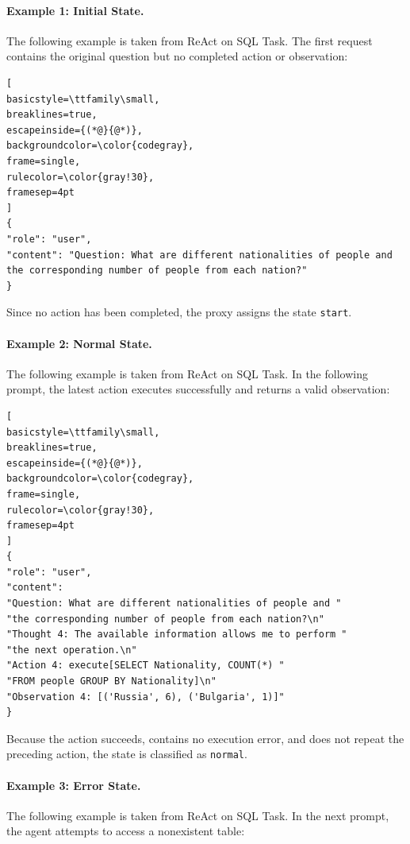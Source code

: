 \paragraph{Example 1: Initial State.}
The following example is taken from ReAct on SQL Task.
The first request contains the original question but no completed
action or observation:

\begin{lstlisting}[
basicstyle=\ttfamily\small,
breaklines=true,
escapeinside={(*@}{@*)},
backgroundcolor=\color{codegray},
frame=single,
rulecolor=\color{gray!30},
framesep=4pt
]
{
"role": "user",
"content": "Question: What are different nationalities of people and the corresponding number of people from each nation?"
}
\end{lstlisting}

Since no action has been completed, the proxy assigns the state
\texttt{start}.

\paragraph{Example 2: Normal State.}
The following example is taken from ReAct on SQL Task.
In the following prompt, the latest action executes successfully and
returns a valid observation:

\begin{lstlisting}[
basicstyle=\ttfamily\small,
breaklines=true,
escapeinside={(*@}{@*)},
backgroundcolor=\color{codegray},
frame=single,
rulecolor=\color{gray!30},
framesep=4pt
]
{
"role": "user",
"content":
"Question: What are different nationalities of people and "
"the corresponding number of people from each nation?\n"
"Thought 4: The available information allows me to perform "
"the next operation.\n"
"Action 4: execute[SELECT Nationality, COUNT(*) "
"FROM people GROUP BY Nationality]\n"
"Observation 4: [('Russia', 6), ('Bulgaria', 1)]"
}
\end{lstlisting}

Because the action succeeds, contains no execution error, and does not
repeat the preceding action, the state is classified as
\texttt{normal}.

\paragraph{Example 3: Error State.}
The following example is taken from ReAct on SQL Task.
In the next prompt, the agent attempts to access a nonexistent table:

